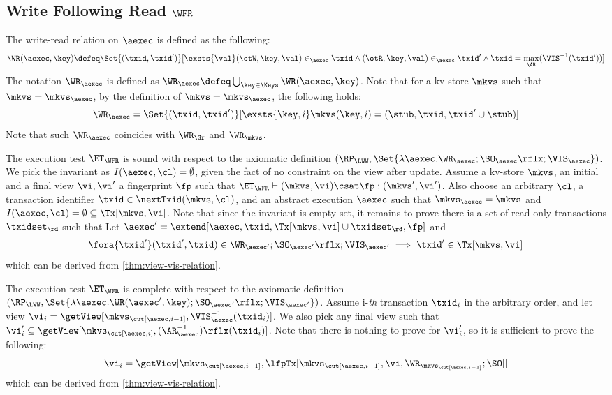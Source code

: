 \subsection{Write Following Read \( \WFR \) }
\label{sec:sound-complete-wfr}

The write-read relation  on \( \aexec \) is defined as the following:
\[
    \WR(\aexec, \key) \defeq \Set{ (\txid, \txid') }[ \exsts{\val} (\otW, \key, \val) \in_\aexec \txid \land (\otR, \key, \val) \in_\aexec \txid' \land \txid = \max_\AR(\VIS^{-1}(\txid')) ]
\]
The notation \( \WR_\aexec \) is defined as \( \WR_\aexec \defeq \bigcup_{\key \in \Keys} \WR(\aexec, \key) \).
Note that for a kv-store \( \mkvs \) such that \( \mkvs = \mkvs_\aexec \),
by the definition of  \(  \mkvs = \mkvs_\aexec \), 
the following holds:
\[
    \WR_\aexec = \Set{(\txid, \txid')}[\exsts{\key, i } \mkvs(\key, i) = (\stub, \txid, \txid'\cup \stub)]
\]
Note that such \( \WR_\aexec \) coincides with \( \WR_\Gr \) and \( \WR_\mkvs \).

The execution test $\ET_\WFR$ is sound with respect to the axiomatic definition 
\( (\RP_{\LWW}, \Set{\lambda \aexec. \WR_\aexec ; \SO_{\aexec}\rflx ; \VIS_{\aexec} })\).
We pick the invariant as \( I( \aexec, \cl ) = \emptyset \), given the fact of no constraint on the view after update.
Assume a kv-store $\mkvs$, an initial and a final view $\vi, \vi'$  a fingerprint $\fp$ 
such that $\ET_{\WFR} \vdash (\mkvs, \vi) \csat \fp: (\mkvs', \vi')$. 
Also choose an arbitrary $\cl$, a transaction identifier $\txid \in \nextTxid(\mkvs, \cl)$, 
and an abstract execution $\aexec$ such that $\mkvs_{\aexec} = \mkvs$ and 
\( I(\aexec, \cl) =  \emptyset \subseteq \Tx[\mkvs, \vi] \).
Note that since the invariant is empty set, it remains to prove there is a set of read-only transactions \( \txidset_\rd \) such that
Let \( \aexec' = \extend[\aexec, \txid, \Tx[\mkvs, \vi] \cup \txidset_\rd, \fp] \) and
\[
    \begin{array}{@{}l@{}}
        \fora{ \txid' } 
        (\txid' ,\txid)  \in \WR_{\aexec'} ; \SO_{\aexec'}\rflx ; \VIS_{\aexec'} 
        \implies \txid' \in \Tx[\mkvs, \vi]
    \end{array}
\]
which can be derived from \cref{thm:view-vis-relation}.

The execution test $\ET_\WFR$ is complete with respect to the axiomatic definition 
\( (\RP_{\LWW}, \Set{\lambda \aexec. \WR(\aexec', \key) ; \SO_{\aexec'}\rflx ; \VIS_{\aexec'} })\).
Assume i-\emph{th} transaction \( \txid_i \) in the arbitrary order,
and let view \( \vi_{i} = \getView[\mkvs_{\cut[\aexec, i-1]}, \VIS^{-1}_{\aexec}(\txid_{i})] \).
We also pick any final view such that \( \vi'_{i} \subseteq \getView[\mkvs_{\cut[\aexec, i]}, (\AR^{-1}_{\aexec})\rflx(\txid_{i})] \).
Note that there is nothing to prove for \( \vi'_i \),
so it is sufficient to prove the following:
\[
    \vi_i = \getView[\mkvs_{\cut[\aexec, i-1]}, \lfpTx[\mkvs_{\cut[\aexec, i-1]},\vi,\WR_{\mkvs_{\cut[\aexec, i-1]}}; \SO]]
\]
which can be derived from \cref{thm:view-vis-relation}.
